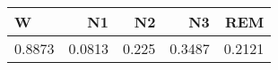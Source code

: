 \begin{tabular}{lrrrr}
\hline
W & N1 & N2 & N3 & REM \\
\hline
0.8873 & 0.0813 & 0.225 & 0.3487 & 0.2121 \\
\hline
\end{tabular}

